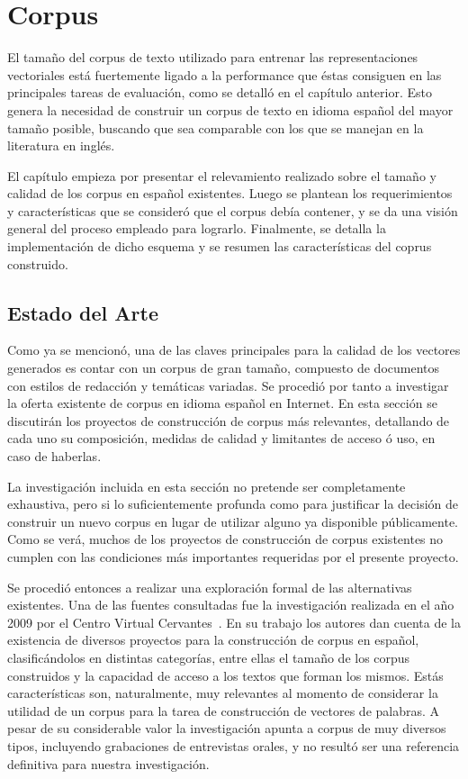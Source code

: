\chapter{Corpus}

El tamaño del corpus de texto utilizado para entrenar las representaciones vectoriales está
fuertemente ligado a la performance que éstas consiguen en las principales tareas de evaluación,
como se detalló en el capítulo anterior. Esto genera la necesidad de construir un corpus de texto en
idioma español del mayor tamaño posible, buscando que sea comparable con los que se manejan en la
literatura en inglés.

El capítulo empieza por presentar el relevamiento realizado sobre el tamaño y calidad de los corpus
en español existentes. Luego se plantean los requerimientos y características que se consideró que
el corpus debía contener, y se da una visión general del proceso empleado para lograrlo. Finalmente,
se detalla la implementación de dicho esquema y se resumen las características del coprus
construido.

\section{Estado del Arte}

Como ya se mencionó, una de las claves principales para la calidad de los vectores generados es contar
con un corpus de gran tamaño, compuesto de documentos con estilos de redacción y temáticas variadas.
Se procedió por tanto a investigar la oferta existente de corpus en idioma español en Internet. En esta
sección se discutirán los proyectos de construcción de corpus más relevantes, detallando de cada uno su
composición, medidas de calidad y limitantes de acceso ó uso, en caso de haberlas.

La investigación incluida en esta sección no pretende ser completamente exhaustiva, pero si lo
suficientemente profunda como para justificar la decisión de construir un nuevo corpus en lugar de
utilizar alguno ya disponible públicamente. Como se verá, muchos de los proyectos de construcción de
corpus existentes no cumplen con las condiciones más importantes requeridas por el presente proyecto.

Se procedió entonces a realizar una exploración formal de las alternativas existentes. Una de las
fuentes consultadas fue la investigación realizada en el año 2009 por el Centro Virtual
Cervantes~\cite{CorpusCervantes}. En su trabajo los autores dan cuenta de la existencia de diversos
proyectos para la construcción de corpus en español, clasificándolos en distintas categorías, entre ellas
el tamaño de los corpus construidos y la capacidad de acceso a los textos que forman los mismos. Estás
características son, naturalmente, muy relevantes al momento de considerar la utilidad de un corpus para la
tarea de construcción de vectores de palabras. A pesar de su considerable valor la investigación apunta a
corpus de muy diversos tipos, incluyendo grabaciones de entrevistas orales, y no resultó ser una referencia
definitiva para nuestra investigación.

